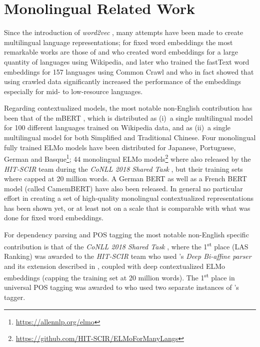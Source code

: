 \chapter{Monolingual Related Work}

Since the introduction of \emph{word2vec} \citep{mikolov-etal-2013-distributed}, many attempts have been made to create multilingual language representations; for fixed word embeddings the most remarkable works are those of \citep{al-rfou-etal-2013-polyglot} and \citep{bojanowski-etal-2017-enriching} who created word embeddings for a large quantity of languages using Wikipedia, and later \citep{grave-etal-2018-learning} who trained the fastText word embeddings for 157 languages using Common Crawl and who in fact showed that using crawled data significantly increased the performance of the embeddings especially for mid- to low-resource languages.

Regarding contextualized models, the most notable non-English contribution has been that of the mBERT \citep{devlin-etal-2019-bert}, which is distributed as (i)~a single multilingual model for 100 different languages trained on Wikipedia data, and as (ii)~a single multilingual model for both Simplified and Traditional Chinese. Four monolingual fully trained ELMo models have been distributed for Japanese, Portuguese, German and Basque\footnote{\url{https://allennlp.org/elmo}}; 44 monolingual ELMo models\footnote{\url{https://github.com/HIT-SCIR/ELMoForManyLangs}} where also released by the \emph{HIT-SCIR} team \citep{che-etal-2018-towards} during the \emph{CoNLL 2018 Shared Task} \citep{zeman-etal-2018-conll}, but their training sets where capped at 20 million words. A German BERT \citep{chan-etal-2019-german} as well as a French BERT model (called CamemBERT) \citep{martin-etal-2020-camembert} have also been released. In general no particular effort in creating a set of high-quality monolingual contextualized representations has been shown yet, or at least not on a scale that is comparable with what was done for fixed word embeddings.

For dependency parsing and POS tagging the most notable non-English specific contribution is that of the \emph{CoNLL 2018 Shared Task} \citep{zeman-etal-2018-conll}, where the 1\textsuperscript{st} place (LAS Ranking) was awarded to the \emph{HIT-SCIR} team \citep{che-etal-2018-towards} who used \citet{dozat-manning-2017-deep}'s \emph{Deep Bi-affine parser} and its extension described in \citep{dozat-etal-2017-stanfords}, coupled with deep contextualized ELMo embeddings \citep{peters-etal-2018-deep} (capping the training set at 20 million words). The 1\textsuperscript{st} place in universal POS tagging was awarded to \citet{smith-etal-2018-82} who used two separate instances of \citet{bohnet-etal-2018-morphosyntactic}'s tagger.

